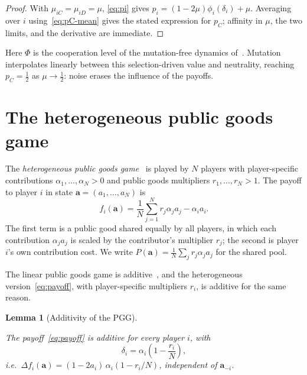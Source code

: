 \documentclass[11pt]{article}
\newtheorem{lemma}{Lemma}
\newcommand{\bfa}{\mathbf{a}}
\newcommand{\pC}{p_C}
\begin{document}
\begin{proof}

With \(\mu_{iC}=\mu_{iD}=\mu\), \eqref{eq:pi} gives
\(p_i=(1-2\mu)\phi_i(\delta_i)+\mu\). Averaging over \(i\) using~\eqref{eq:pC-mean}
gives
the stated expression for \(\pC\); affinity in \(\mu\), the two limits, and the
derivative are immediate.

\end{proof}

Here \(\Phi\) is the cooperation level of the mutation-free dynamics
of~\cite{couto2023multiplayer}. Mutation interpolates linearly between this
selection-driven value and neutrality, reaching \(\pC=\tfrac{1}{2}\) as
\(\mu\to\tfrac{1}{2}\): noise erases the influence of the payoffs.

\section{The heterogeneous public goods game}\label{sec:payoff}

The \emph{heterogeneous public goods game}~\cite{hauser2019social} is played by \(N\)
players with player-specific contributions \(\alpha_1,\ldots,\alpha_N>0\) and public
goods
multipliers \(r_1,\ldots,r_N>1\). The payoff to player \(i\) in state
\(\bfa=(a_1,\ldots,a_N)\) is
\begin{equation}\label{eq:payoff}
  f_i(\bfa) = \frac{1}{N}\sum_{j=1}^N r_j\alpha_j a_j - \alpha_i a_i.
\end{equation}
The first term is a public good shared equally by all players, in which each
contribution \(\alpha_j a_j\) is scaled by the contributor's multiplier \(r_j\); the
second is player \(i\)'s own contribution cost. We write
\(P(\bfa)=\frac{1}{N}\sum_j r_j\alpha_j a_j\) for the shared pool.

The linear public goods game is additive~\cite{couto2023multiplayer}, and the
heterogeneous version~\eqref{eq:payoff}, with player-specific multipliers \(r_i\), is
additive for the same reason.

\begin{lemma}[Additivity of the PGG]
\label{lem:payoff-identity}

The payoff~\eqref{eq:payoff} is additive for every player \(i\), with
\begin{equation}\label{eq:delta-pi}
  \delta_i = \alpha_i\!\left(1-\frac{r_i}{N}\right),
\end{equation}
i.e.\ \(\Delta f_i(\bfa)=(1-2a_i)\,\alpha_i(1-r_i/N)\), independent of \(\bfa_{-i}\).
\end{lemma}
\end{document}
